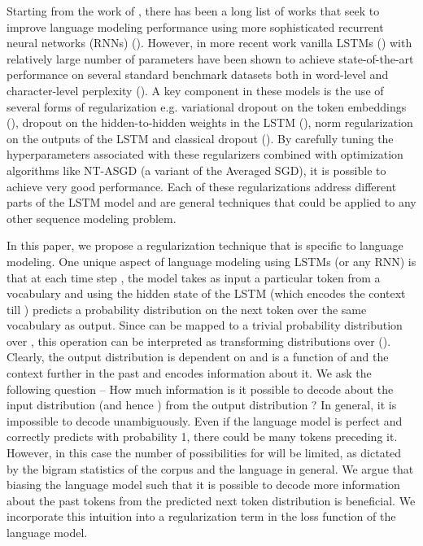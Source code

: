 \documentclass{article} \usepackage{iclr2019_conference,times}
\begin{document}
Starting from the work of \cite{Mikolov2010RecurrentNN}, there has been a long list of works that seek to improve language modeling performance using more sophisticated recurrent neural networks (RNNs) (\cite{Zaremba2014RecurrentNN, Zilly2017RecurrentHN, Zoph2016NeuralAS, Mujika2017FastSlowRN}). 
However, in more recent work vanilla LSTMs (\cite{Hochreiter1997}) with relatively large number of parameters   have been shown to achieve state-of-the-art performance on several standard benchmark datasets both in word-level and character-level perplexity (\cite{Merity2018,Merity2018AnAO,Melis2018,Yang2017BreakingTS}). A key component in these models is the use of several forms of regularization e.g. variational dropout on the token embeddings (\cite{Gal2016ATG}), dropout on the hidden-to-hidden weights in the LSTM (\cite{Wan2013RegularizationON}), norm regularization on the outputs of the LSTM and classical dropout (\cite{Srivastava2014DropoutAS}). By carefully tuning the hyperparameters associated with these regularizers combined with optimization algorithms like NT-ASGD (a variant of the Averaged SGD), it is possible to achieve very good performance. Each of these regularizations address different parts of the LSTM model and are general techniques that could be applied to any other sequence modeling problem. 

In this paper, we propose a regularization technique that is specific to  language modeling. One unique aspect of language modeling using LSTMs (or any RNN) is that at each time step , the model takes as input a particular token  from a vocabulary  and using the hidden state of the LSTM (which encodes the context till ) predicts a probability distribution  on the next token  over the same vocabulary as output. Since   can be mapped to a trivial probability distribution over , this operation can be interpreted as transforming distributions over  (\cite{Inan2016TyingWV}). Clearly, the output distribution is dependent on and is a function of  and the context further in the past and encodes information about it. We ask the following question -- How much information is it possible to decode about the input distribution (and hence )  from the output distribution ? In general, it is impossible to decode   unambiguously. Even if the language model is perfect and correctly predicts  with probability 1, there could be many tokens preceding it. However, in this case the number of possibilities for  will be limited, as dictated by the bigram statistics of the corpus and the language in general. We argue that biasing the language model such that it is possible to decode more information about the past tokens from the predicted next token distribution is beneficial. We incorporate this intuition into a regularization term in the loss function of the language model. 
\end{document}
